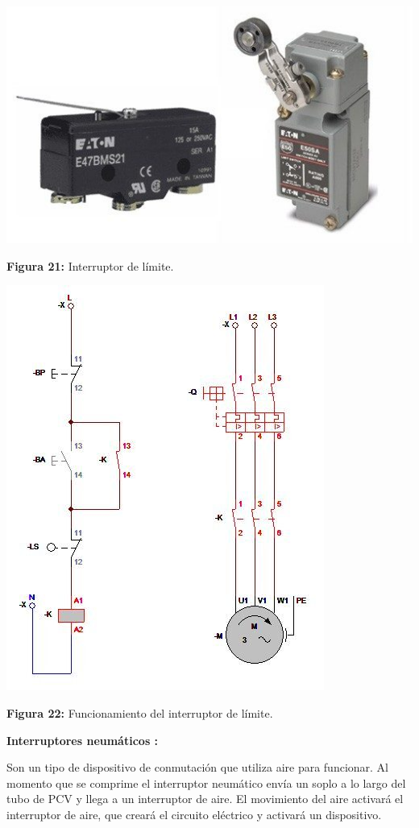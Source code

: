 \begin{center}
	\includegraphics[width=0.4\linewidth, height=0.2\textwidth]{img/intlimite}
	
	\vspace{2mm} %
	
	\textbf{Figura 21:} Interruptor de límite.
\end{center}

\vspace{5mm} %

\begin{center}
	\includegraphics[width=0.4\linewidth]{img/Sinterruptordelimite}
	
	\vspace{2mm} %
	
	\textbf{Figura 22:} Funcionamiento del interruptor de límite.
\end{center}


\vspace{10mm}
\textbf{Interruptores neumáticos : }

Son un tipo de dispositivo de conmutación que utiliza aire para funcionar. Al momento que se comprime el interruptor neumático envía un soplo a lo largo del tubo de PCV y llega a un interruptor de aire. El movimiento del aire activará el interruptor de aire, que creará el circuito eléctrico y activará un dispositivo.
\vspace{5mm}

